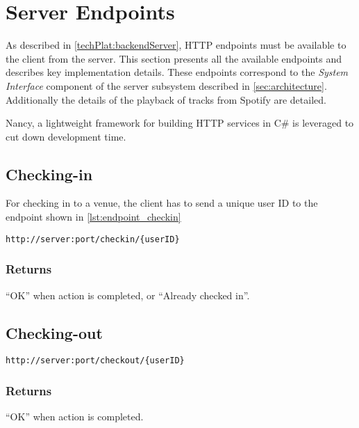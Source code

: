 \section{Server Endpoints}
\label{imp:backendServer}

As described in \cref{techPlat:backendServer}, HTTP endpoints must be
available to the client from the server. This section presents all the
available endpoints and describes key implementation
details. These endpoints correspond to the \emph{System Interface} component of the
server subsystem described in \cref{sec:architecture}. Additionally the details of the playback of tracks from
Spotify are detailed.

Nancy, a lightweight framework for building HTTP services in C\# is leveraged
to cut down development time.

\subsection{Checking-in}
For checking in to a venue, the client has to send a unique user ID to
the endpoint shown in \cref{lst:endpoint_checkin}

\begin{lstlisting}[label={lst:endpoint_checkin}, caption={HTTP endpoint allowing client to check-in to a venue. Text surrounded by curly brackets are parameters.}]
http://server:port/checkin/{userID}
\end{lstlisting}

\subsubsection{Returns}
\enquote{OK} when action is completed, or \enquote{Already checked in}.

\subsection{Checking-out}

\begin{lstlisting}[label={lst:endpoint_checkout}, caption={Text surrounded by curly brackets are parameters.}]
http://server:port/checkout/{userID}
\end{lstlisting}

\subsubsection{Returns}
\enquote{OK} when action is completed.

